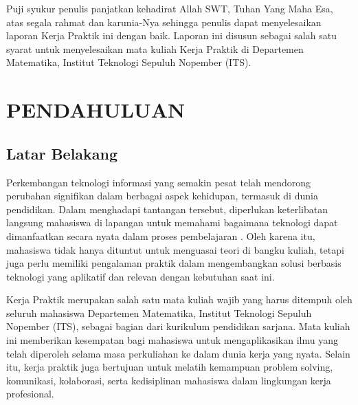 \documentclass{file/KP-ITS}
\theoremstyle{definition}
\theoremstyle{definition}
\theoremstyle{plain}
\begin{document}

\BagianAwal
\Cover
\LembarJudul
\TitlePage
\LembarPengesahanDepartemen
\LembarPengesahanInstansi
\LembarOrisinalitas

\restoregeometry
\KataPengantar
Puji syukur penulis panjatkan kehadirat Allah SWT, Tuhan Yang Maha Esa, atas segala rahmat dan karunia-Nya sehingga penulis dapat menyelesaikan laporan Kerja Praktik ini dengan baik. Laporan ini disusun sebagai salah satu syarat untuk menyelesaikan mata kuliah Kerja Praktik di Departemen Matematika, Institut Teknologi Sepuluh Nopember (ITS).


\DaftarIsi

\DaftarGambar






\BagianInti

\chapter{PENDAHULUAN}
\section{Latar Belakang}
Perkembangan teknologi informasi yang semakin pesat telah mendorong perubahan signifikan dalam berbagai aspek kehidupan, termasuk di dunia pendidikan. Dalam menghadapi tantangan tersebut, diperlukan keterlibatan langsung mahasiswa di lapangan untuk memahami bagaimana teknologi dapat dimanfaatkan secara nyata dalam proses pembelajaran \cite{suryadi2019}. Oleh karena itu, mahasiswa tidak hanya dituntut untuk menguasai teori di bangku kuliah, tetapi juga perlu memiliki pengalaman praktik dalam mengembangkan solusi berbasis teknologi yang aplikatif dan relevan dengan kebutuhan saat ini.

Kerja Praktik merupakan salah satu mata kuliah wajib yang harus ditempuh oleh seluruh mahasiswa Departemen Matematika, Institut Teknologi Sepuluh Nopember (ITS), sebagai bagian dari kurikulum pendidikan sarjana. Mata kuliah ini memberikan kesempatan bagi mahasiswa untuk mengaplikasikan ilmu yang telah diperoleh selama masa perkuliahan ke dalam dunia kerja yang nyata. Selain itu, kerja praktik juga bertujuan untuk melatih kemampuan problem solving, komunikasi, kolaborasi, serta kedisiplinan mahasiswa dalam lingkungan kerja profesional.
\end{document}
